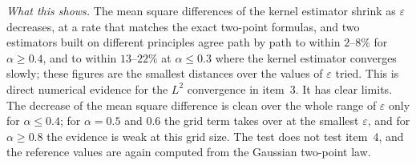 \documentclass[11pt]{article}
\theoremstyle{remark}
\theoremstyle{definition}
\begin{document}
\emph{What this shows.} The mean square differences of the kernel estimator shrink as $\varepsilon$ decreases, at a rate that matches the exact two-point formulas, and two estimators built on different principles agree path by path to within $2$--$8\%$ for $\alpha\ge0.4$, and to within $13$--$22\%$ at $\alpha\le0.3$ where the kernel estimator converges slowly; these figures are the smallest distances over the values of $\varepsilon$ tried. This is direct numerical evidence for the $L^2$ convergence in item~3. It has clear limits. The decrease of the mean square difference is clean over the whole range of $\varepsilon$ only for $\alpha\le0.4$; for $\alpha=0.5$ and $0.6$ the grid term takes over at the smallest $\varepsilon$, and for $\alpha\ge0.8$ the evidence is weak at this grid size. The test does not test item~4, and the reference values are again computed from the Gaussian two-point law.
\end{document}
